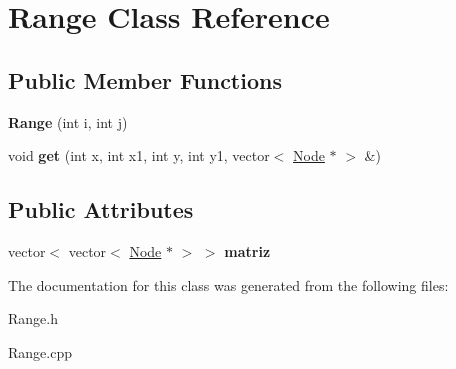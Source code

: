\hypertarget{classRange}{
\section{Range Class Reference}
\label{classRange}
}
\subsection*{Public Member Functions}
\begin{DoxyCompactItemize}
\item 
\hypertarget{classRange_affe4c2308c5e7cd91ee70664e134c092}{
{\bfseries Range} (int i, int j)}
\label{classRange_affe4c2308c5e7cd91ee70664e134c092}

\item 
\hypertarget{classRange_ab761e066f65fc48c08d0f11d11669eff}{
void {\bfseries get} (int x, int x1, int y, int y1, vector$<$ \hyperlink{classNode}{Node} $\ast$ $>$ \&)}
\label{classRange_ab761e066f65fc48c08d0f11d11669eff}

\end{DoxyCompactItemize}
\subsection*{Public Attributes}
\begin{DoxyCompactItemize}
\item 
\hypertarget{classRange_a56537f50be230eb34c3547530084f08e}{
vector$<$ vector$<$ \hyperlink{classNode}{Node} $\ast$ $>$ $>$ {\bfseries matriz}}
\label{classRange_a56537f50be230eb34c3547530084f08e}

\end{DoxyCompactItemize}


The documentation for this class was generated from the following files:\begin{DoxyCompactItemize}
\item 
Range.h\item 
Range.cpp\end{DoxyCompactItemize}
